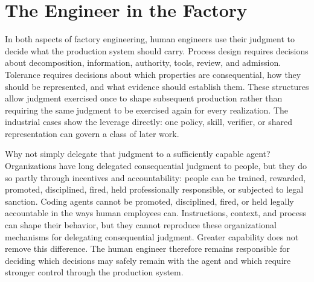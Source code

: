 \section{The Engineer in the Factory}\label{heading:the-engineer-in-the-factory}


In both aspects of factory engineering, human engineers use their judgment to decide what the production system should carry. Process design requires decisions about decomposition, information, authority, tools, review, and admission. Tolerance requires decisions about which properties are consequential, how they should be represented, and what evidence should establish them. These structures allow judgment exercised once to shape subsequent production rather than requiring the same judgment to be exercised again for every realization. The industrial cases show the leverage directly: one policy, skill, verifier, or shared representation can govern a class of later work.


Why not simply delegate that judgment to a sufficiently capable agent? Organizations have long delegated consequential judgment to people, but they do so partly through incentives and accountability: people can be trained, rewarded, promoted, disciplined, fired, held professionally responsible, or subjected to legal sanction.\citep{marchsimon1958} Coding agents cannot be promoted, disciplined, fired, or held legally accountable in the ways human employees can. Instructions, context, and process can shape their behavior, but they cannot reproduce these organizational mechanisms for delegating consequential judgment. Greater capability does not remove this difference. The human engineer therefore remains responsible for deciding which decisions may safely remain with the agent and which require stronger control through the production system.

